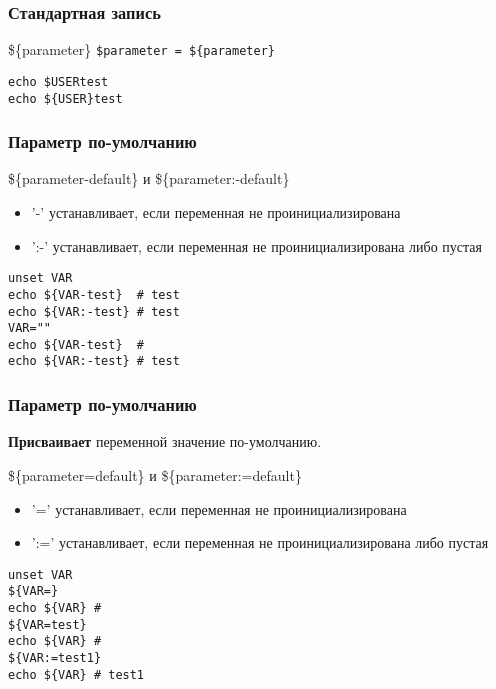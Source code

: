 

\begin{frame}[fragile]
	\frametitle{Стандартная запись}

	\begin{block}{\$\{parameter\}}
		{\tt \$parameter = \$\{parameter\}}

	\begin{lstlisting}
echo $USERtest
echo ${USER}test
	\end{lstlisting}
	\end{block}

\end{frame}

\begin{frame}[fragile]
	\frametitle{Параметр по-умолчанию}

	\begin{block}{\$\{parameter-default\} и \$\{parameter:-default\}}
	\begin{itemize}
		\item '-' устанавливает, если переменная не проинициализирована
		\item ':-' устанавливает, если переменная не проинициализирована либо пустая
	\end{itemize}
	\begin{lstlisting}
unset VAR
echo ${VAR-test}  # test
echo ${VAR:-test} # test
VAR=""
echo ${VAR-test}  #
echo ${VAR:-test} # test
	\end{lstlisting}
	\end{block}

\end{frame}

\begin{frame}[fragile]
	\frametitle{Параметр по-умолчанию}

	{\bf Присваивает} переменной значение по-умолчанию.

	\begin{block}{\$\{parameter=default\} и \$\{parameter:=default\}}
	\begin{itemize}
		\item '=' устанавливает, если переменная не проинициализирована
		\item ':=' устанавливает, если переменная не проинициализирована либо пустая
	\end{itemize}
	\begin{lstlisting}
unset VAR
${VAR=}
echo ${VAR} # 
${VAR=test}
echo ${VAR} # 
${VAR:=test1}
echo ${VAR} # test1
	\end{lstlisting}
	\end{block}

\end{frame}

